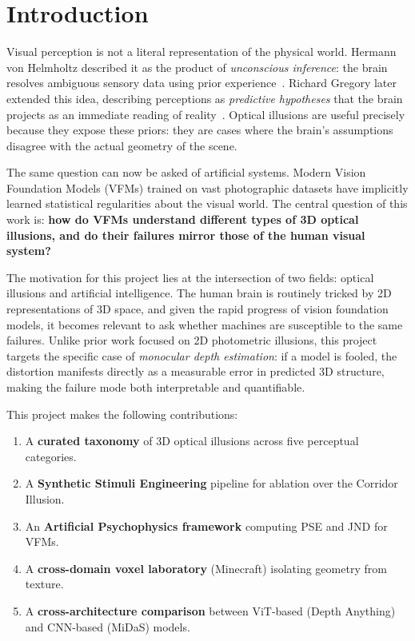 \documentclass[10pt,twocolumn]{article}
\begin{document}
\section{Introduction}
\label{sec:intro}

Visual perception is not a literal representation of the physical world. Hermann von
Helmholtz described it as the product of \emph{unconscious inference}: the brain
resolves ambiguous sensory data using prior experience~\cite{gregory1997}. Richard
Gregory later extended this idea, describing perceptions as \emph{predictive
hypotheses} that the brain projects as an immediate reading of reality~\cite{gregory1997}.
Optical illusions are useful precisely because they expose these priors: they are
cases where the brain's assumptions disagree with the actual geometry of the scene.

The same question can now be asked of artificial systems. Modern Vision Foundation
Models (VFMs) trained on vast photographic datasets have implicitly learned statistical
regularities about the visual world. The central question of this work is: \textbf{how do
VFMs understand different types of 3D optical illusions, and do their failures mirror those
of the human visual system?}

The motivation for this project lies at the intersection of two fields: optical illusions and
artificial intelligence. The human brain is routinely tricked by 2D representations of 3D
space, and given the rapid progress of vision foundation models, it becomes relevant to ask
whether machines are susceptible to the same failures. Unlike prior work focused on
2D photometric illusions, this project targets the specific case of \emph{monocular depth
estimation}: if a model is fooled, the distortion manifests directly as a measurable error
in predicted 3D structure, making the failure mode both interpretable and quantifiable.

This project makes the following contributions:
\begin{enumerate}
  \item A \textbf{curated taxonomy} of 3D optical illusions across five perceptual categories.
  \item A \textbf{Synthetic Stimuli Engineering} pipeline for ablation over the Corridor Illusion.
  \item An \textbf{Artificial Psychophysics framework} computing PSE and JND for VFMs.
  \item A \textbf{cross-domain voxel laboratory} (Minecraft) isolating geometry from texture.
  \item A \textbf{cross-architecture comparison} between ViT-based (Depth Anything) and CNN-based (MiDaS) models.
\end{enumerate}
\end{document}
